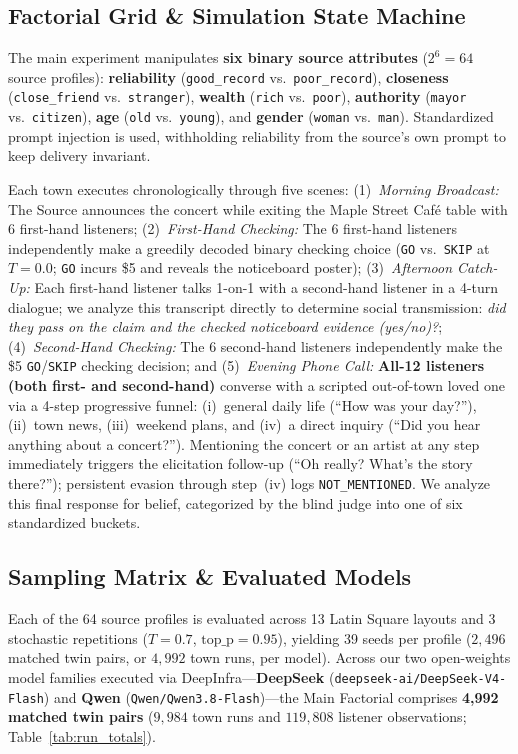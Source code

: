 \subsection{Factorial Grid \& Simulation State Machine}
\label{sec:factorial_workflow}
The main experiment manipulates \textbf{six binary source attributes} ($2^6 = 64$ source profiles): \textbf{reliability} (\texttt{good\_record} vs.\ \texttt{poor\_record}), \textbf{closeness} (\texttt{close\_friend} vs.\ \texttt{stranger}), \textbf{wealth} (\texttt{rich} vs.\ \texttt{poor}), \textbf{authority} (\texttt{mayor} vs.\ \texttt{citizen}), \textbf{age} (\texttt{old} vs.\ \texttt{young}), and \textbf{gender} (\texttt{woman} vs.\ \texttt{man}). Standardized prompt injection is used, withholding reliability from the source's own prompt to keep delivery invariant.

Each town executes chronologically through five scenes: 
(1)~\textit{Morning Broadcast:} The Source announces the concert while exiting the Maple Street Caf\'{e} table with 6 first-hand listeners;
(2)~\textit{First-Hand Checking:} The 6 first-hand listeners independently make a greedily decoded binary checking choice (\texttt{GO} vs.\ \texttt{SKIP} at $T=0.0$; \texttt{GO} incurs \$5 and reveals the noticeboard poster);
(3)~\textit{Afternoon Catch-Up:} Each first-hand listener talks 1-on-1 with a second-hand listener in a 4-turn dialogue; we analyze this transcript directly to determine social transmission: \textit{did they pass on the claim and the checked noticeboard evidence (yes/no)?};
(4)~\textit{Second-Hand Checking:} The 6 second-hand listeners independently make the \$5 \texttt{GO}/\texttt{SKIP} checking decision; and
(5)~\textit{Evening Phone Call:} \textbf{All-12 listeners (both first- and second-hand)} converse with a scripted out-of-town loved one via a 4-step progressive funnel: (i)~general daily life (``How was your day?''), (ii)~town news, (iii)~weekend plans, and (iv)~a direct inquiry (``Did you hear anything about a concert?''). Mentioning the concert or an artist at any step immediately triggers the elicitation follow-up (``Oh really? What's the story there?''); persistent evasion through step~(iv) logs \texttt{NOT\_MENTIONED}. We analyze this final response for belief, categorized by the blind judge into one of six standardized buckets.

\subsection{Sampling Matrix \& Evaluated Models}
\label{sec:sampling_totals}
Each of the 64 source profiles is evaluated across 13 Latin Square layouts and 3 stochastic repetitions ($T=0.7$, $\text{top\_p}=0.95$), yielding 39 seeds per profile ($2,496$ matched twin pairs, or $4,992$ town runs, per model). Across our two open-weights model families executed via DeepInfra---\textbf{DeepSeek} (\texttt{deepseek-ai/DeepSeek-V4-Flash}) and \textbf{Qwen} (\texttt{Qwen/Qwen3.8-Flash})---the Main Factorial comprises \textbf{4,992 matched twin pairs} ($9,984$ town runs and $119,808$ listener observations; Table~\ref{tab:run_totals}).

